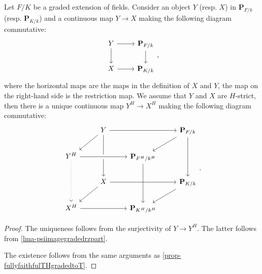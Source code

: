 \begin{proposition}\label{prop-maprzdescentdtostrict}
    Let $F/K$ be a graded extension of fields. Consider an object $Y$ (resp. $X$) in $\mathbf{P}_{F/k}$ (resp. $\mathbf{P}_{K/k}$) and a continuous map $Y\rightarrow X$ making the following diagram commutative:
    \[
        \begin{tikzcd}
            Y \arrow[r] \arrow[d] & \mathbf{P}_{F/k} \arrow[d] \\
            X \arrow[r]           & \mathbf{P}_{K/k}          
        \end{tikzcd},  
    \]
    where the horizontal maps are the maps in the definition of $X$ and $Y$, the map on the right-hand side is the restriction map. We assume that $Y$ and $X$ are $H$-strict, then there is a unique continuous map $Y^{H}\rightarrow X^H$ making the following diagram commutative:
    \[
        \begin{tikzcd}
            & Y \arrow[rr] \arrow[dd] \arrow[ld] &                                 & \mathbf{P}_{F/k} \arrow[dd] \arrow[ld] \\
Y^{H} \arrow[rr, crossing over] \arrow[dd, dotted] &                                    & \mathbf{P}_{F^H/k^H} \arrow[dd, crossing over] &                                        \\
            & X \arrow[rr] \arrow[ld]            &                                 & \mathbf{P}_{K/k} \arrow[ld]            \\
X^H \arrow[rr]                      &                                    & \mathbf{P}_{K^H/k^H}            &                                       
\end{tikzcd}.  
    \]

\end{proposition}
\begin{proof}
    The uniqueness follows from the surjectivity of $Y\rightarrow Y^H$. The latter follows from \cref{lma-psiimagegradedrzpart}.

    The existence follows from the same arguments as \cref{prop-fullyfaithfulTHgradedtoT}.
\end{proof}

